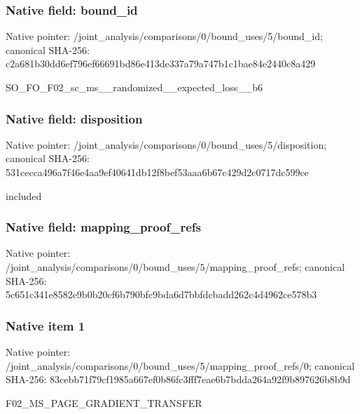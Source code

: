 \documentclass[10pt,a4paper]{article}
\begin{document}
\subsubsection{Native field: bound\_\allowbreak{}id}
Native pointer: /joint\_\allowbreak{}analysis/comparisons/0/bound\_\allowbreak{}uses/5/bound\_\allowbreak{}id; canonical SHA-256: c2a681b30dd6ef796ef66691bd86e413de337a79a747b1c1bae84e2440c8a429

\begingroup\raggedright\sloppy SO\_\allowbreak{}FO\_\allowbreak{}F02\_\allowbreak{}sc\_\allowbreak{}ms\_\allowbreak{}\_\allowbreak{}randomized\_\allowbreak{}\_\allowbreak{}expected\_\allowbreak{}loss\_\allowbreak{}\_\allowbreak{}b6\par\endgroup

\subsubsection{Native field: disposition}
Native pointer: /joint\_\allowbreak{}analysis/comparisons/0/bound\_\allowbreak{}uses/5/disposition; canonical SHA-256: 531cecca496a7f46e4aa9ef40641db12f8bef53aaa6b67c429d2c0717dc599ce

\begingroup\raggedright\sloppy included\par\endgroup

\subsubsection{Native field: mapping\_\allowbreak{}proof\_\allowbreak{}refs}
Native pointer: /joint\_\allowbreak{}analysis/comparisons/0/bound\_\allowbreak{}uses/5/mapping\_\allowbreak{}proof\_\allowbreak{}refs; canonical SHA-256: 5c651c341e8582e9b0b20cf6b790bfc9bda6d7bbfdcbadd262c4d4962ce578b3

\subsubsection{Native item 1}
Native pointer: /joint\_\allowbreak{}analysis/comparisons/0/bound\_\allowbreak{}uses/5/mapping\_\allowbreak{}proof\_\allowbreak{}refs/0; canonical SHA-256: 83cebb71f79cf1985a667ef0b86fc3fff7eae6b7bdda264a92f9b897626b8b9d

\begingroup\raggedright\sloppy F02\_\allowbreak{}MS\_\allowbreak{}PAGE\_\allowbreak{}GRADIENT\_\allowbreak{}TRANSFER\par\endgroup
\end{document}
